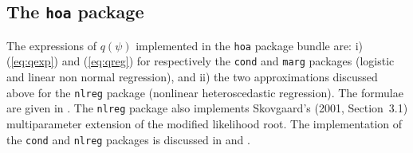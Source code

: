 \documentclass[a4paper,11pt]{article}
\def\code{\texttt}
\begin{document}
\subsection*{The \code{hoa} package}
%
The expressions of $q(\psi)$ implemented in the \code{hoa} package bundle are: i) (\ref{eq:qexp}) and (\ref{eq:qreg}) for respectively the \code{cond} and \code{marg} packages (logistic and linear non normal regression), and ii) the two approximations discussed above for the \code{nlreg} package (nonlinear heteroscedastic regression).  The formulae are given in \citet{brazzale.davison.reid:2006}.  The \code{nlreg} package also implements Skovgaard's (2001, Section~3.1)
\nocite{skovgaard:2001} multiparameter extension of the modified likelihood root.  The implementation of the \code{cond} and \code{nlreg} packages is discussed in \citet{brazzale:1999} and \citet{bellio.brazzale:2003}.
\end{document}

